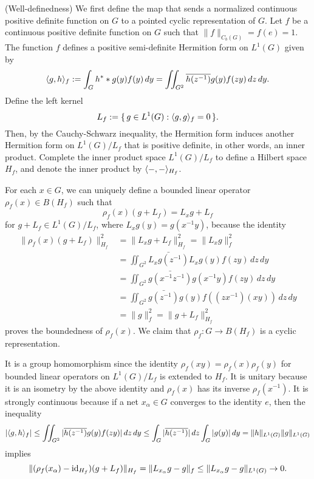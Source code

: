 \documentclass[a4paper]{article}
\begin{document}
\begin{pf}
(Well-definedness)
We first define the map that sends a normalized continuous positive definite function on $G$ to a pointed cyclic representation of $G$.
Let $f$ be a continuous positive definite function on $G$ such that $\|f\|_{C_b(G)}=f(e)=1$.
The function $f$ defines a positive semi-definite Hermition form on $L^1(G)$ given by
\[\langle g,h\rangle_f:=\int_Gh^**g(y)f(y)\,dy=\iint_{G^2}\overline{h(z^{-1})}g(y)f(zy)\,dz\,dy.\]
Define the left kernel
\[L_f:=\{\,g\in L^1(G):\langle g,g\rangle_f=0\,\}.\]
Then, by the Cauchy-Schwarz inequality, the Hermition form induces another Hermition form on $L^1(G)/L_f$ that is positive definite, in other words, an inner product.
Complete the inner product space $L^1(G)/L_f$ to define a Hilbert space $H_f$, and denote the inner product by $\langle-,-\rangle_{H_f}$.

For each $x\in G$, we can uniquely define a bounded linear operator $\rho_f(x)\in B(H_f)$ such that
\[\rho_f(x)(g+L_f)=L_xg+L_f\]
for $g+L_f\in L^1(G)/L_f$, where $L_xg(y)=g(x^{-1}y)$, because the identity
\begin{align*}
\|\rho_f(x)(g+L_f)\|_{H_f}^2&=\|L_xg+L_f\|_{H_f}^2=\|L_xg\|_f^2\\
&=\iint_{G^2}\bar{L_xg(z^{-1})}L_xg(y)f(zy)\,dz\,dy\\
&=\iint_{G^2}\bar{g(x^{-1}z^{-1})}g(x^{-1}y)f(zy)\,dz\,dy\\
&=\iint_{G^2}\bar{g(z^{-1})}g(y)f((zx^{-1})(xy))\,dz\,dy\\
&=\|g\|_f^2=\|g+L_f\|_{H_f}^2
\end{align*}
proves the boundedness of $\rho_f(x)$.
We claim that $\rho_f:G\to B(H_f)$ is a cyclic representation.

It is a group homomorphism since the identity $\rho_f(xy)=\rho_f(x)\rho_f(y)$ for bounded linear operators on $L^1(G)/L_f$ is extended to $H_f$.
It is unitary because it is an isometry by the above identity and $\rho_f(x)$ has its inverse $\rho_f(x^{-1})$.
It is strongly continuous because if a net $x_\alpha\in G$ converges to the identity $e$, then the inequality
\[|\langle g,h\rangle_f|\le\iint_{G^2}|\overline{h(z^{-1})}g(y)f(zy)|\,dz\,dy\le\int_G|\overline{h(z^{-1})}|\,dz\int_G|g(y)|\,dy=\|h\|_{L^1(G)}\|g\|_{L^1(G)}\]
implies
\[\|(\rho_f(x_\alpha)-\operatorname{id}_{H_f})(g+L_f)\|_{H_f}=\|L_{x_\alpha}g-g\|_f\le\|L_{x_\alpha}g-g\|_{L^1(G)}\to0.\]


\end{pf}
\end{document}
